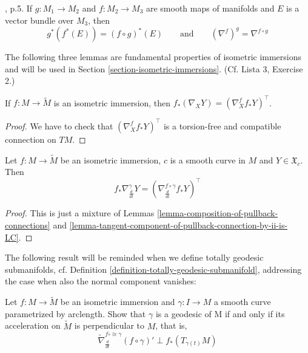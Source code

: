 \begin{lemma}
\label{lemma-composition-of-pullback-connections}
\cite{aulas}, p.5. If $g:M_1\to M_2$ and $f:M_2\to M_3$ are smooth maps of 
manifolds and $E$ is a vector bundle over $M_3$, then
$$
g^* (f^* (E))=(f\circ g)^* (E)\qquad \text{and}\qquad
(\nabla^f)^g=\nabla^{f\circ g}
$$
\end{lemma}

The following three lemmas are fundamental properties of isometric
immersions and will be used in Section \ref{section-isometric-immersions}. (Cf.
Lista 3, Exercise 2.)

\begin{lemma}
\label{lemma-tangent-component-of-pullback-connection-by-ii-is-LC}
If $f:M \to \tilde{M}$ is an isometric immersion, then 
$f_*(\nabla_XY)=(\nabla^f_Xf_*Y)^\top$.
\end{lemma}

\begin{proof}
We have to check that $(\nabla^f_Xf_*Y)^\top$ is a torsion-free and compatible
connection on $TM$.
\end{proof}

\begin{lemma}
\label{lemma-isometric-immersion-along-curve}
Let $f:M \to \tilde{M}$ be an isometric immersion, $c$ is a smooth curve in $M$
and $Y\in\mathfrak{X}_c$. Then
$$
f_*\nabla_{\frac{d}{dt}}^\gamma Y
=\left(\nabla^{f\circ\gamma}_{\frac{d}{dt}}f_*Y\right)^\top
$$
\end{lemma}

\begin{proof}
This is just a mixture of Lemmas \ref{lemma-composition-of-pullback-connections}
 and \ref{lemma-tangent-component-of-pullback-connection-by-ii-is-LC}.
\end{proof}

The following result will be reminded when we define totally geodesic
submanifolds, cf. Definition \ref{definition-totally-geodesic-submanifold},
addressing the case when also the normal component vanishes:

\begin{lemma}
\label{lemma-geodesics-of-submanifold-characterization}
Let $f:M \to \tilde{M}$ be an isometric immersion and $\gamma:I\to M$ a smooth
curve parametrized by arclength. Show that $\gamma$ is a geodesic of M
if and only if its acceleration on $\tilde{M}$ is perpendicular to $M$, that is,
$$
\tilde{\nabla}^{f\circ\cong\gamma}_{\frac{d}{dt}}(f\circ\gamma)'\perp
f_*(T_{\gamma(t)}M)
$$
\end{lemma}

